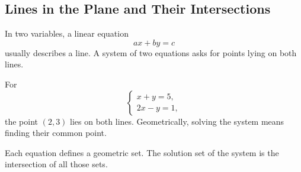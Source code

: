 \subsection{Lines in the Plane and Their Intersections}

In two variables, a linear equation
\[
ax+by=c
\]
usually describes a line. A system of two equations asks for points lying on both lines.

\begin{examplebox}
For
\[
\begin{cases}
x+y=5,\\
2x-y=1,
\end{cases}
\]
the point $(2,3)$ lies on both lines. Geometrically, solving the system means finding their common point.
\end{examplebox}

\begin{corebox}
Each equation defines a geometric set. The solution set of the system is the intersection of all those sets.
\end{corebox}
